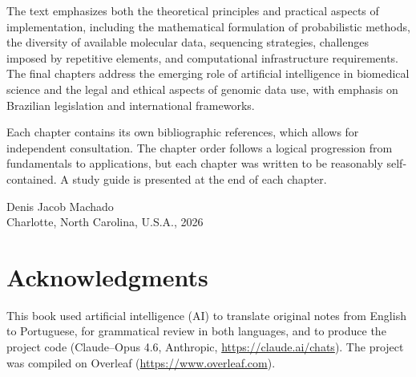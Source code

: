 \documentclass[11pt,a4paper,openright,twoside]{book}
\theoremstyle{definition}
\theoremstyle{plain}
\theoremstyle{remark}
\begin{document}
    The text emphasizes both the theoretical principles and practical aspects of implementation, including the mathematical formulation of probabilistic methods, the diversity of available molecular data, sequencing strategies, challenges imposed by repetitive elements, and computational infrastructure requirements. The final chapters address the emerging role of artificial intelligence in biomedical science and the legal and ethical aspects of genomic data use, with emphasis on Brazilian legislation and international frameworks.

    Each chapter contains its own bibliographic references, which allows for independent consultation. The chapter order follows a logical progression from fundamentals to applications, but each chapter was written to be reasonably self-contained. A study guide is presented at the end of each chapter.

\vspace{1cm}
\begin{flushright}
Denis Jacob Machado\\
Charlotte, North Carolina, U.S.A., 2026
\end{flushright}

\mainmatter













\backmatter

\chapter{Acknowledgments}

    This book used artificial intelligence (AI) to translate original notes from English to Portuguese, for grammatical review in both languages, and to produce the  project code (Claude--Opus 4.6, Anthropic, \href{https://claude.ai/chats}{https://claude.ai/chats}). The project was compiled on Overleaf (\href{https://www.overleaf.com}{https://www.overleaf.com}).
\end{document}
